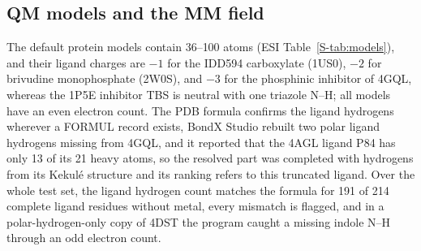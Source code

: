 \documentclass[journal=jcisd8,manuscript=article,layout=two-column]{achemso}
\newcommand{\BX}{BondX Studio}
\begin{document}
\subsection{QM models and the MM field}
The default protein models contain 36--100 atoms (ESI Table~\ref{S-tab:models}), and their ligand charges are $-1$ for the IDD594 carboxylate (1US0), $-2$ for brivudine monophosphate (2W0S), and $-3$ for the phosphinic inhibitor of 4GQL, whereas the 1P5E inhibitor TBS is neutral with one triazole N--H; all models have an even electron count. The PDB formula confirms the ligand hydrogens wherever a FORMUL record exists, \BX{} rebuilt two polar ligand hydrogens missing from 4GQL, and it reported that the 4AGL ligand P84 has only 13 of its 21 heavy atoms, so the resolved part was completed with hydrogens from its Kekul\'e structure and its ranking refers to this truncated ligand. Over the whole test set, the ligand hydrogen count matches the formula for 191 of 214 complete ligand residues without metal, every mismatch is flagged, and in a polar-hydrogen-only copy of 4DST the program caught a missing indole N--H through an odd electron count.
\end{document}
